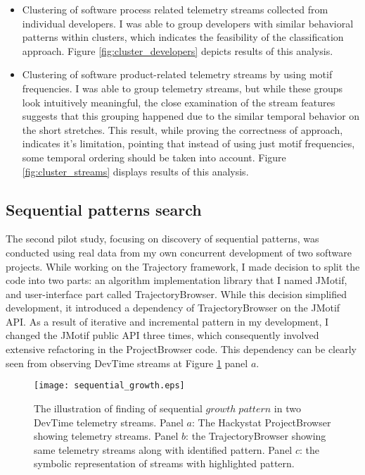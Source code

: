 \begin{itemize}
	\item Clustering of software process related telemetry streams collected from individual developers. I was able to group developers with similar behavioral patterns within clusters, which indicates the feasibility of the classification approach. Figure \ref{fig:cluster_developers} depicts results of this analysis.
	\item Clustering of software product-related telemetry streams by using motif frequencies. I was able to group telemetry streams, but while these groups look intuitively meaningful, the close examination of the stream features suggests that this grouping happened due to the similar temporal behavior on the short stretches. This result, while proving the correctness of approach, indicates it's limitation, pointing that instead of using just motif frequencies, some temporal ordering should be taken into account. Figure \ref{fig:cluster_streams} displays results of this analysis.
\end{itemize}

\subsection{Sequential patterns search}
The second pilot study, focusing on discovery of sequential patterns, was conducted using real data from my own concurrent development of two software projects. While working on the Trajectory framework, I made decision to split the code into two parts: an algorithm implementation library that I named JMotif, and user-interface part called TrajectoryBrowser. While this decision simplified development, it introduced a dependency of TrajectoryBrowser on the JMotif API. As a result of iterative and incremental pattern in my development, I changed the JMotif public API three times, which consequently involved extensive refactoring in the ProjectBrowser code. This dependency can be clearly seen from observing DevTime streams at Figure \ref{fig:sequential_growth} panel $a$. 

\begin{figure}[tbp]
   \centering
   \texttt{[image: sequential\_growth.eps]}
   \caption{The illustration of finding of sequential $growth \; pattern$ in two DevTime telemetry streams. Panel $a$: The Hackystat ProjectBrowser showing telemetry streams. Panel $b$: the TrajectoryBrowser showing same telemetry streams along with identified pattern. Panel $c$: the symbolic representation of streams with highlighted pattern.}
   \label{fig:sequential_growth}
\end{figure}

